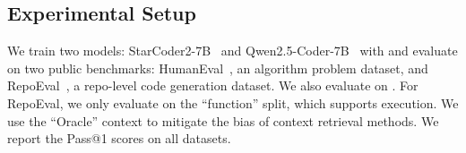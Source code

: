 \begin{table}[t]
\centering
{}
\caption{Code generation training results. We evaluate Pass@1 for all experiments. For RepoEval, we use the ``Oracle'' repo-level context as used in their original paper.
}
\label{tab:repost_main}
\end{table}


\subsection{Experimental Setup} 
We train two models: StarCoder2-7B~\citep{starcoder2} and Qwen2.5-Coder-7B~\citep{qwen25coder} with \reposttrainsetName and evaluate on two public benchmarks: HumanEval~\citep{codex}, an algorithm problem dataset, and RepoEval~\citep{repocoder}, a repo-level code generation dataset. We also evaluate on \repostevalsetName.
For RepoEval, we only evaluate on the ``function'' split, which supports execution. We use the ``Oracle'' context to mitigate the bias of context retrieval methods.
We report the Pass@1 scores on all datasets.


